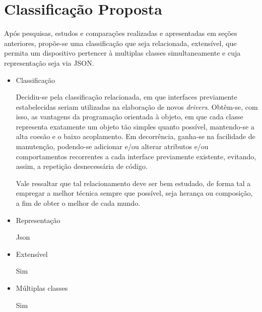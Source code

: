 \chapter{Classificação Proposta}

Após pesquisas, estudos e comparações realizadas e apresentadas em seções anteriores, propõe-se uma classificação que seja relacionada, extensível, que permita um dispositivo pertencer à multiplas classes simultaneamente e cuja representação seja via JSON.


\begin{comment}
Neste capítulo falaremos sobre a Classificação de Dispositivos proposta. Essa classificação deverá ser relacionada, extensível e um dispositivo deverá poder fazer parte de múltiplas classes. A classificação relacionada facilita a implementação de novos \emph{drivers} para o \emph{uOS} que poderão se aproveitar das interfaces já existentes. Ser extensível, pois permite uma relação de especialização entre diferentes classes. A capacidade de permitir que um dispositivo pertença à diferentes classes, garante uma flexibilidade para dispositivos com diversos recursos poderem se encaixar nas classificações padrões sem a necessidade da definição de uma nova classe.
\end{comment}

\begin{itemize}
	\item Classificação

	Decidiu-se pela classificação relacionada, em que interfaces previamente estabelecidas seriam utilizadas na elaboração de novos \emph{drivers}. Obtêm-se, com isso, as vantagens da programação orientada à objeto, em que cada classe representa exatamente um objeto tão simples quanto possível, mantendo-se a alta coesão e o baixo acoplamento. Em decorrência, ganha-se na facilidade de manutenção, podendo-se adicionar e/ou alterar atributos e/ou comportamentos recorrentes a cada interface previamente existente, evitando, assim, a repetição desnecessária de código.

	Vale ressaltar que tal relacionamento deve ser bem estudado, de forma tal a empregar a melhor técnica sempre que possível, seja herança ou composição, a fim de obter o melhor de cada mundo.

	\item Representação

	Json

	\item Extensível

	Sim

	\item Múltiplas classes

	Sim
\end{itemize}

